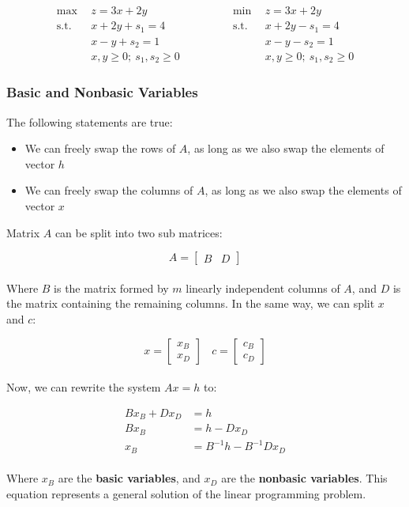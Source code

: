 \documentclass{article}
\begin{document}
\begin{equation*}
  \begin{split}
  	\max~~ & z = 3x+2y \\
	\text{s.t.}~~ & x+2y+s_1 = 4 \\
	~~& x-y+s_2 = 1 \\
	~~& x,y \geq 0;~ s_1, s_2 \geq 0
  \end{split}
\quad\quad\quad\quad
  \begin{split}
    \min~~ & z = 3x+2y \\
	\text{s.t.}~~ & x+2y-s_1 = 4 \\
	~~& x-y-s_2 = 1 \\
	~~& x,y \geq 0;~ s_1, s_2 \geq 0
  \end{split}
\end{equation*}

\subsubsection{Basic and Nonbasic Variables}
The following statements are true:

\begin{itemize}
	\item We can freely swap the rows of $A$, as long as we also swap the elements of vector $h$
	\item We can freely swap the columns of $A$, as long as we also swap the elements of vector $x$
\end{itemize}
Matrix $A$ can be split into two sub matrices:

\[ A = \begin{bmatrix} B & D \end{bmatrix} \] \\
Where $B$ is the matrix formed by $m$ linearly independent columns of $A$, and $D$ is the matrix containing the remaining columns. In the same way, we can split $x$ and $c$:

\[ x = \begin{bmatrix} x_B \\ x_D \end{bmatrix} ~~~~ c = \begin{bmatrix} c_B \\ c_D \end{bmatrix} \] \\
Now, we can rewrite the system $Ax = h$ to:

\begin{align*}
	Bx_B + Dx_D &= h \\
	Bx_B &= h - Dx_D \\
	x_B &= B^{-1}h - B^{-1}Dx_D
\end{align*} \\
Where $x_B$ are the \textbf{basic variables}, and $x_D$ are the \textbf{nonbasic variables}. This equation represents a general solution of the linear programming problem.
\end{document}
